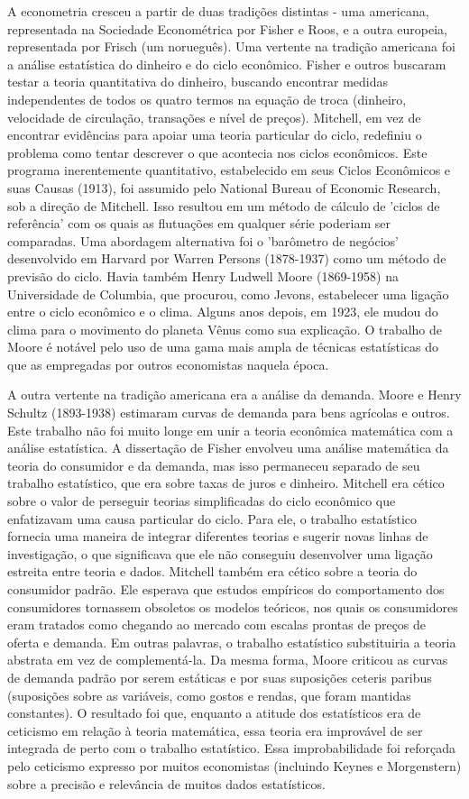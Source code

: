\documentclass[12pt]{article}
\begin{document}
A econometria cresceu a partir de duas tradições distintas - uma americana, representada na Sociedade Econométrica por Fisher e Roos, e a outra europeia, representada por Frisch (um norueguês). Uma vertente na tradição americana foi a análise estatística do dinheiro e do ciclo econômico. Fisher e outros buscaram testar a teoria quantitativa do dinheiro, buscando encontrar medidas independentes de todos os quatro termos na equação de troca (dinheiro, velocidade de circulação, transações e nível de preços). Mitchell, em vez de encontrar evidências para apoiar uma teoria particular do ciclo, redefiniu o problema como tentar descrever o que acontecia nos ciclos econômicos. Este programa inerentemente quantitativo, estabelecido em seus Ciclos Econômicos e suas Causas (1913), foi assumido pelo National Bureau of Economic Research, sob a direção de Mitchell. Isso resultou em um método de cálculo de 'ciclos de referência' com os quais as flutuações em qualquer série poderiam ser comparadas. Uma abordagem alternativa foi o 'barômetro de negócios' desenvolvido em Harvard por Warren Persons (1878-1937) como um método de previsão do ciclo. Havia também Henry Ludwell Moore (1869-1958) na Universidade de Columbia, que procurou, como Jevons, estabelecer uma ligação entre o ciclo econômico e o clima. Alguns anos depois, em 1923, ele mudou do clima para o movimento do planeta Vênus como sua explicação. O trabalho de Moore é notável pelo uso de uma gama mais ampla de técnicas estatísticas do que as empregadas por outros economistas naquela época.

A outra vertente na tradição americana era a análise da demanda. Moore e Henry Schultz (1893-1938) estimaram curvas de demanda para bens agrícolas e outros. Este trabalho não foi muito longe em unir a teoria econômica matemática com a análise estatística. A dissertação de Fisher envolveu uma análise matemática da teoria do consumidor e da demanda, mas isso permaneceu separado de seu trabalho estatístico, que era sobre taxas de juros e dinheiro. Mitchell era cético sobre o valor de perseguir teorias simplificadas do ciclo econômico que enfatizavam uma causa particular do ciclo. Para ele, o trabalho estatístico fornecia uma maneira de integrar diferentes teorias e sugerir novas linhas de investigação, o que significava que ele não conseguiu desenvolver uma ligação estreita entre teoria e dados. Mitchell também era cético sobre a teoria do consumidor padrão. Ele esperava que estudos empíricos do comportamento dos consumidores tornassem obsoletos os modelos teóricos, nos quais os consumidores eram tratados como chegando ao mercado com escalas prontas de preços de oferta e demanda. Em outras palavras, o trabalho estatístico substituiria a teoria abstrata em vez de complementá-la. Da mesma forma, Moore criticou as curvas de demanda padrão por serem estáticas e por suas suposições ceteris paribus (suposições sobre as variáveis, como gostos e rendas, que foram mantidas constantes). O resultado foi que, enquanto a atitude dos estatísticos era de ceticismo em relação à teoria matemática, essa teoria era improvável de ser integrada de perto com o trabalho estatístico. Essa improbabilidade foi reforçada pelo ceticismo expresso por muitos economistas (incluindo Keynes e Morgenstern) sobre a precisão e relevância de muitos dados estatísticos.
\end{document}
